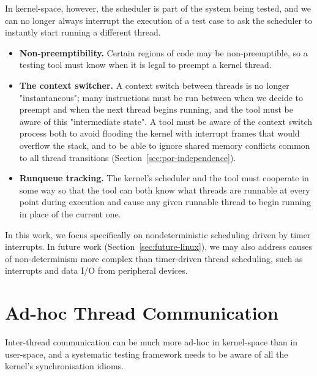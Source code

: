In kernel-space, however, the scheduler is part of the system being tested, and we can no longer always interrupt the execution of a test case to ask the scheduler to instantly start running a different thread.
\begin{itemize}
	\item {\bf Non-preemptibility.} Certain regions of code may be non-preemptible, so a testing tool must know when it is legal to preempt a kernel thread.
	\item {\bf The context switcher.} A context switch between threads is no longer "instantaneous"; many instructions must be run between when we decide to preempt and when the next thread begins running, and the tool must be aware of this "intermediate state". A tool must be aware of the context switch process both to avoid flooding the kernel with interrupt frames that would overflow the stack, and to be able to ignore shared memory conflicts common to all thread transitions (Section~\ref{sec:por-independence}).
	\item {\bf Runqueue tracking.} The kernel's scheduler and the tool must cooperate in some way so that the tool can both know what threads are runnable at every point during execution and cause any given runnable thread to begin running in place of the current one.
\end{itemize}

In this work, we focus specifically on nondeterministic scheduling driven by timer interrupts. In future work (Section~\ref{sec:future-linux}), we may also address causes of non-determinism more complex than timer-driven thread scheduling, such as interrupts and data I/O from peripheral devices.

\section{Ad-hoc Thread Communication}

Inter-thread communication can be much more ad-hoc in kernel-space than in user-space\hspace{0in}\cite{datacollider}, and a systematic testing framework needs to be aware of all the kernel's synchronisation idioms.

